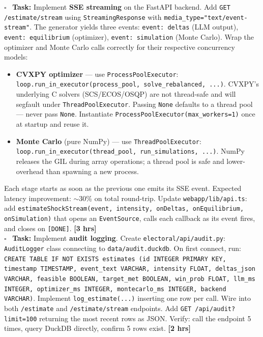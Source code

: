 \documentclass[11pt]{article}
\newcommand{\hrs}[1]{\textbf{[#1 hrs]}}
\newcommand{\task}[2]{%
  \noindent\textbf{Task:} #1 \hfill \hrs{#2}\\}
\newcommand{\done}{\textcolor{sectionblue}{$\square$}\ }
\begin{document}
\begin{taskbox}
\done \task{Implement \textbf{SSE streaming} on the FastAPI backend.
  Add \texttt{GET /estimate/stream} using \texttt{StreamingResponse}
  with \texttt{media\_type="text/event-stream"}. The generator yields
  three events: \texttt{event: deltas} (LLM output), \texttt{event:
  equilibrium} (optimizer), \texttt{event: simulation} (Monte Carlo).
  Wrap the optimizer and Monte Carlo calls correctly for their respective
  concurrency models:
  \begin{itemize}[leftmargin=1.6em, itemsep=1pt]
    \item \textbf{CVXPY optimizer} --- use \texttt{ProcessPoolExecutor}:
          \texttt{loop.run\_in\_executor(process\_pool, solve\_rebalanced,
          ...)}.
          CVXPY's underlying C solvers (SCS/ECOS/OSQP) are not thread-safe
          and will segfault under \texttt{ThreadPoolExecutor}. Passing
          \texttt{None} defaults to a thread pool --- never pass \texttt{None}.
          Instantiate \texttt{ProcessPoolExecutor(max\_workers=1)} once at
          startup and reuse it.
    \item \textbf{Monte Carlo} (pure NumPy) --- use \texttt{ThreadPoolExecutor}:
          \texttt{loop.run\_in\_executor(thread\_pool, run\_simulations, ...)}.
          NumPy releases the GIL during array operations; a thread pool is
          safe and lower-overhead than spawning a new process.
  \end{itemize}
  Each stage starts as soon as the previous one emits its SSE event.
  Expected latency improvement: $\sim$30\% on total round-trip. Update
  \texttt{webapp/lib/api.ts}: add \texttt{estimateShockStream(event,
  intensity, onDeltas, onEquilibrium, onSimulation)} that opens an
  \texttt{EventSource}, calls each callback as its event fires, and
  closes on \texttt{[DONE]}.}{3}

\done \task{Implement \textbf{audit logging}. Create
  \texttt{electoral/api/audit.py}: \texttt{AuditLogger} class connecting
  to \texttt{data/audit.duckdb}. On first connect, run:
  \texttt{CREATE TABLE IF NOT EXISTS estimates (id INTEGER PRIMARY KEY,
  timestamp TIMESTAMP, event\_text VARCHAR, intensity FLOAT, deltas\_json
  VARCHAR, feasible BOOLEAN, target\_met BOOLEAN, win\_prob FLOAT, llm\_ms
  INTEGER, optimizer\_ms INTEGER, montecarlo\_ms INTEGER, backend VARCHAR)}.
  Implement \texttt{log\_estimate(...)} inserting one row per call. Wire
  into both \texttt{/estimate} and \texttt{/estimate/stream} endpoints.
  Add \texttt{GET /api/audit?limit=100} returning the most recent rows as
  JSON. Verify: call the endpoint 5 times, query DuckDB directly, confirm
  5 rows exist.}{2}
\end{taskbox}
\end{document}

